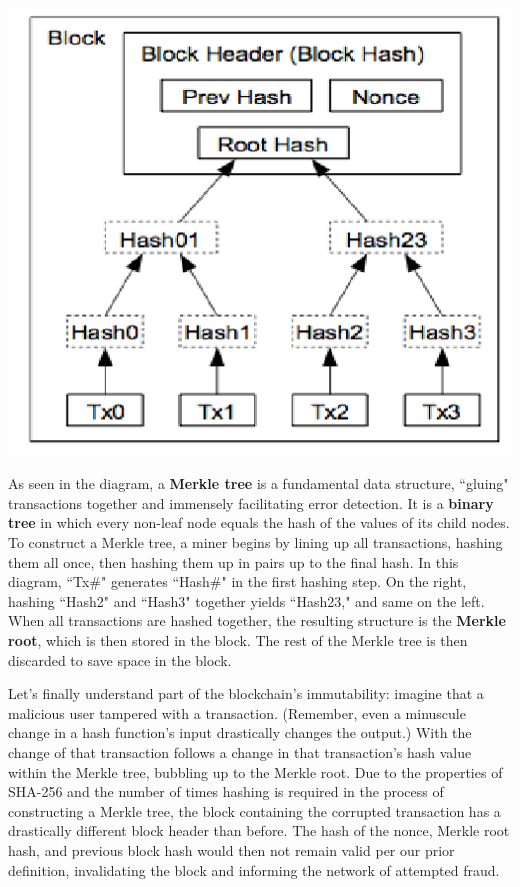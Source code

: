 \documentclass[11pt]{article}
\begin{document}
   
   \medskip
   \begin{center}
   \includegraphics[scale=0.6]{merkle}
   \end{center}
   \smallskip
   
   As seen in the diagram, a \textbf{Merkle tree} is a fundamental data structure, ``gluing" transactions together and immensely facilitating error detection. It is a \textbf{binary tree} in which every non-leaf node equals the hash of the values of its child nodes. To construct a Merkle tree, a miner begins by lining up all transactions, hashing them all once, then hashing them up in pairs up to the final hash. In this diagram, ``Tx\#" generates ``Hash\#" in the first hashing step. On the right, hashing ``Hash2" and ``Hash3" together yields ``Hash23," and same on the left. When all transactions are hashed together, the resulting structure is the \textbf{Merkle root}, which is then stored in the block. The rest of the Merkle tree is then discarded to save space in the block.
   
   Let's finally understand part of the blockchain's immutability: imagine that a malicious user tampered with a transaction. (Remember, even a minuscule change in a hash function's input drastically changes the output.) With the change of that transaction follows a change in that transaction's hash value within the Merkle tree, bubbling up to the Merkle root. Due to the properties of SHA-256 and the number of times hashing is required in the process of constructing a Merkle tree, the block containing the corrupted transaction has a drastically different block header than before. The hash of the nonce, Merkle root hash, and previous block hash would then not remain valid per our prior definition, invalidating the block and informing the network of attempted fraud.
   
\end{document}
